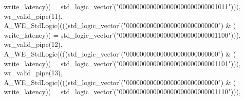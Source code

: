 \begin{DoxyCode}
{      write_latency}\textcolor{vhdlchar}{)}\textcolor{vhdlchar}{)} \textcolor{vhdlchar}{=} \textcolor{comment}{std\_logic\_vector}\textcolor{vhdlchar}{'}\textcolor{vhdlchar}{(}\textcolor{vhdllogic}{"00000000000000000000000000001011"}\textcolor{vhdlchar}{)}\textcolor{vhdlchar}{)}\textcolor{vhdlchar}{)}\textcolor{vhdlchar}{,} \textcolor{vhdlchar}{
      wr_valid_pipe}\textcolor{vhdlchar}{(}\textcolor{vhdllogic}{}\textcolor{vhdllogic}{11}\textcolor{vhdlchar}{)}\textcolor{vhdlchar}{,} \textcolor{vhdlchar}{A\_WE\_StdLogic}\textcolor{vhdlchar}{(}\textcolor{vhdlchar}{(}\textcolor{vhdlchar}{(}\textcolor{vhdlchar}{(}\textcolor{comment}{std\_logic\_vector}\textcolor{vhdlchar}{'}\textcolor{vhdlchar}{(}\textcolor{vhdllogic}{"000000000000000000000000000"}\textcolor{vhdlchar}{)} \textcolor{vhdlchar}{&} \textcolor{vhdlchar}{(}\textcolor{vhdlchar}{
      write_latency}\textcolor{vhdlchar}{)}\textcolor{vhdlchar}{)} \textcolor{vhdlchar}{=} \textcolor{comment}{std\_logic\_vector}\textcolor{vhdlchar}{'}\textcolor{vhdlchar}{(}\textcolor{vhdllogic}{"00000000000000000000000000001100"}\textcolor{vhdlchar}{)}\textcolor{vhdlchar}{)}\textcolor{vhdlchar}{)}\textcolor{vhdlchar}{,} \textcolor{vhdlchar}{
      wr_valid_pipe}\textcolor{vhdlchar}{(}\textcolor{vhdllogic}{}\textcolor{vhdllogic}{12}\textcolor{vhdlchar}{)}\textcolor{vhdlchar}{,} \textcolor{vhdlchar}{A\_WE\_StdLogic}\textcolor{vhdlchar}{(}\textcolor{vhdlchar}{(}\textcolor{vhdlchar}{(}\textcolor{vhdlchar}{(}\textcolor{comment}{std\_logic\_vector}\textcolor{vhdlchar}{'}\textcolor{vhdlchar}{(}\textcolor{vhdllogic}{"000000000000000000000000000"}\textcolor{vhdlchar}{)} \textcolor{vhdlchar}{&} \textcolor{vhdlchar}{(}\textcolor{vhdlchar}{
      write_latency}\textcolor{vhdlchar}{)}\textcolor{vhdlchar}{)} \textcolor{vhdlchar}{=} \textcolor{comment}{std\_logic\_vector}\textcolor{vhdlchar}{'}\textcolor{vhdlchar}{(}\textcolor{vhdllogic}{"00000000000000000000000000001101"}\textcolor{vhdlchar}{)}\textcolor{vhdlchar}{)}\textcolor{vhdlchar}{)}\textcolor{vhdlchar}{,} \textcolor{vhdlchar}{
      wr_valid_pipe}\textcolor{vhdlchar}{(}\textcolor{vhdllogic}{}\textcolor{vhdllogic}{13}\textcolor{vhdlchar}{)}\textcolor{vhdlchar}{,} \textcolor{vhdlchar}{A\_WE\_StdLogic}\textcolor{vhdlchar}{(}\textcolor{vhdlchar}{(}\textcolor{vhdlchar}{(}\textcolor{vhdlchar}{(}\textcolor{comment}{std\_logic\_vector}\textcolor{vhdlchar}{'}\textcolor{vhdlchar}{(}\textcolor{vhdllogic}{"000000000000000000000000000"}\textcolor{vhdlchar}{)} \textcolor{vhdlchar}{&} \textcolor{vhdlchar}{(}\textcolor{vhdlchar}{
      write_latency}\textcolor{vhdlchar}{)}\textcolor{vhdlchar}{)} \textcolor{vhdlchar}{=} \textcolor{comment}{std\_logic\_vector}\textcolor{vhdlchar}{'}\textcolor{vhdlchar}{(}\textcolor{vhdllogic}{"00000000000000000000000000001110"}\textcolor{vhdlchar}{)}\textcolor{vhdlchar}{)}\textcolor{vhdlchar}{)}\textcolor{vhdlchar}{,} \textcolor{vhdlchar}{
}
\end{DoxyCode}
